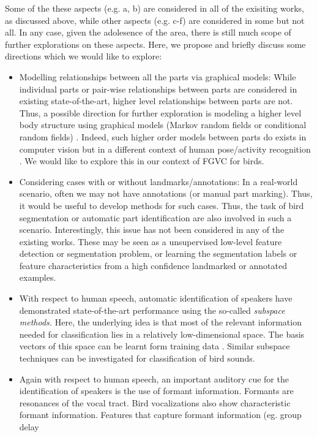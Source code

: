 \documentclass{article}
\begin{document}
Some of the these aspects (e.g. a, b) are considered  in all of the exisiting works, as discussed above, while other aspects (e.g. c-f)  are considered in some but not all. In any case, given the adolesence of the area, there is still much scope of further explorations on these aspects. Here, we propose and briefly discuss some directions which we would like to explore: 
\begin{itemize}
\item Modelling relationships between all the parts via graphical models: While individual parts or pair-wise relationships between parts are considered in existing state-of-the-art, higher level relationships between parts are not. Thus, a possible direction for further exploration is modeling a higher level body structure using graphical models (Markov random fields or conditional random fields) \cite{mrfbook,hmrf,mrf,crf,crf1}. Indeed, such higher order models between parts do exists in computer vision but in a different context of human pose/activity recognition \cite{mrfpose}. We would like to explore this in our context of FGVC for birds.
\item Considering cases with or without landmarks/annotations: In a real-world scenario, often we may not have annotations (or manual part marking). Thus, it would be useful to develop methods for such cases. Thus, the task of bird segmentation or automatic part identification are also involved in such a scenario. Interestingly, this issue has not been considered in any of the existing works. These may be seen as a unsupervised low-level feature detection or segmentation problem, or learning the segmentation labels or feature characteristics from a high confidence landmarked or annotated examples.
\item With respect to human speech, automatic identification of speakers have
demonstrated state-of-the-art performance using the so-called \emph{subspace
methods.} Here, the underlying idea is that most of the relevant information
needed for classification 
lies in a relatively low-dimensional space. The basis vectors of this space can
be learnt form training data \cite{dehak_ivector}. Similar subspace techniques
can be investigated for classification of bird sounds.
\item Again with respect to human speech, an important auditory cue for the
identification of speakers is the use of formant information. Formants are
resonances of the vocal tract. Bird vocalizations also show characteristic
formant information. Features that capture formant information (eg. group delay

\end{itemize}
\end{document}
